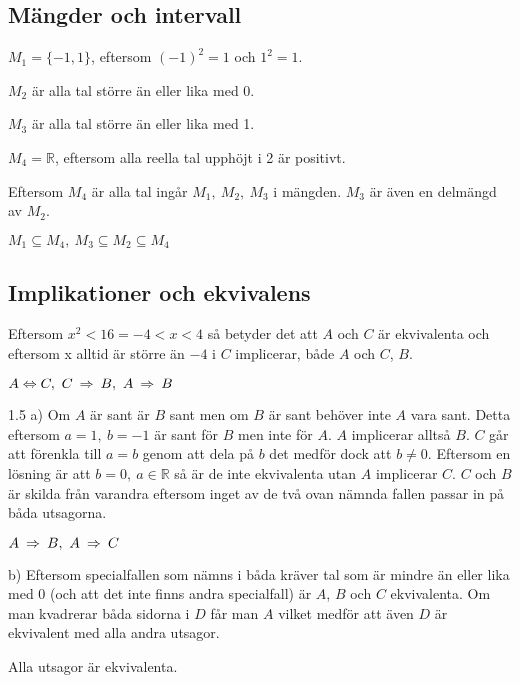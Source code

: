 \subsection*{Mängder och intervall}

\begin{task}{1.3}
	$M_1=\{-1,1\}$, eftersom $(-1)^2=1$ och $1^2=1$.
	
	$M_2$ är alla tal större än eller lika med 0.
	
	$M_3$ är alla tal större än eller lika med 1.
	
	$M_4=\mathbb{R}$, eftersom alla reella tal upphöjt i 2 är positivt.
	
	Eftersom $M_4$ är alla tal ingår $M_1,~M_2,~M_3$ i mängden. $M_3$ är även en delmängd av $M_2$.
	
	\ans $M_1 \subseteq M_4,~ M_3 \subseteq M_2 \subseteq M_4$
\end{task}

\subsection*{Implikationer och ekvivalens}

\begin{task}{1.4}
	Eftersom $x^2<16 = -4<x<4$ så betyder det att $A$ och $C$ är ekvivalenta och
	eftersom x alltid är större än $-4$ i $C$ implicerar, både $A$ och $C$, $B$.
	
	\ans $A \Leftrightarrow C,~ C \ra B,~ A \ra B$
\end{task}

\begin{task}{1.5 a)}
	Om $A$ är sant är $B$ sant men om $B$ är sant behöver inte $A$ vara sant. Detta eftersom $a=1,~b=-1$ är sant för $B$ men inte för $A$. $A$ implicerar alltså $B$. $C$ går att förenkla till $a=b$ genom att dela på $b$ det medför dock att $b\neq0$. Eftersom en lösning är att $b=0,~a\in\mathbb{R}$ så är de inte ekvivalenta utan $A$ implicerar $C$. $C$ och $B$ är skilda från varandra eftersom inget av de två ovan nämnda fallen passar in på båda utsagorna. 
	
	\ans $A \ra B,~ A \ra C$
\end{task}

\begin{task}{b)}
	Eftersom specialfallen som nämns i  båda kräver tal som är mindre än eller lika med 0 (och att det inte finns andra specialfall) är $A$, $B$ och $C$ ekvivalenta. Om man kvadrerar båda sidorna i $D$ får man $A$ vilket medför att även $D$ är ekvivalent med alla andra utsagor.
	
	\ans Alla utsagor är ekvivalenta.
\end{task}


